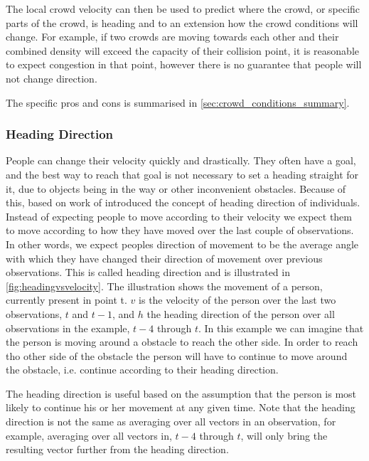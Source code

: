 The local crowd velocity can then be used to predict where the crowd, or specific parts of the crowd, is heading and to an extension how the crowd conditions will change. For example, if two crowds are moving towards each other and their combined density will exceed the capacity of their collision point, it is reasonable to expect congestion in that point, however there is no guarantee that people will not change direction. 


The specific pros and cons is summarised in \cref{sec:crowd_conditions_summary}.

\subsubsection{Heading Direction}\label{subsubsec:headingDirection}
People can change their velocity quickly and drastically. They often have a goal, and the best way to reach that goal is not necessary to set a heading straight for it, due to objects being in the way or other inconvenient obstacles. Because of this, \citet{wirz2012inferring} based on work of \citet{localTrendStatistics} introduced the concept of heading direction of individuals. Instead of expecting people to move according to their velocity we expect them to move according to how they have moved over the last couple of observations. In other words, we expect peoples direction of movement to be the average angle with which they have changed their direction of movement over previous observations. This is called heading direction and is illustrated in \cref{fig:headingvsvelocity}. The illustration shows the movement of a person, currently present in point t. $v$ is the velocity of the person over the last two observations, $t$ and $t-1$, and $h$ the heading direction of the person over all observations in the example, $t-4$ through $t$. In this example we can imagine that the person is moving around a obstacle to reach the other side. In order to reach tho other side of the obstacle the person will have to continue to move around the obstacle, i.e. continue according to their heading direction.

The heading direction is useful based on the assumption that the person is most likely to continue his or her movement at any given time. Note that the heading direction is not the same as averaging over all vectors in an observation, for example, averaging over all vectors in, $t-4$ through $t$, will only bring the resulting vector further from the heading direction.

